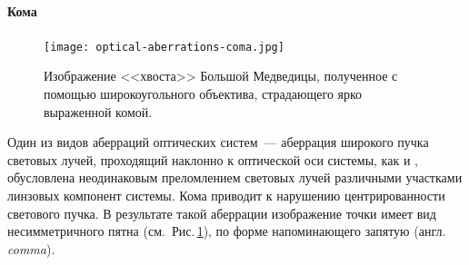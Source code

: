 \paragraph{Кома}

\begin{figure}
    \centering
    \vspace{-1pc}
    \texttt{[image: optical-aberrations-coma.jpg]}
    \caption{Изображение <<хвоста>> Большой Медведицы, полученное с помощью широкоугольного объектива, страдающего ярко выраженной комой.}
    \label{pic:optics-aberrations-coma}
\end{figure}
Один из видов аберраций оптических систем~--- аберрация широкого пучка световых лучей, проходящий наклонно к оптической оси системы, как и , обусловлена неодинаковым преломлением световых лучей различными участками линзовых компонент системы. Кома приводит к нарушению центрированности светового пучка. В результате такой аберрации изображение точки имеет вид несимметричного пятна (см.~Рис.\,\ref{pic:optics-aberrations-coma}), по форме напоминающего запятую (англ. {\itshape comma}).

